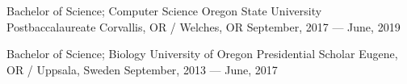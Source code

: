 \showoff
{Bachelor of Science; Computer Science}
{Oregon State University Postbaccalaureate}
{Corvallis, OR / Welches, OR}
{September, 2017 --- June, 2019}

\myBreak

\showoff
{Bachelor of Science; Biology}
{University of Oregon Presidential Scholar}
{Eugene, OR / Uppsala, Sweden}
{September, 2013 --- June, 2017}

